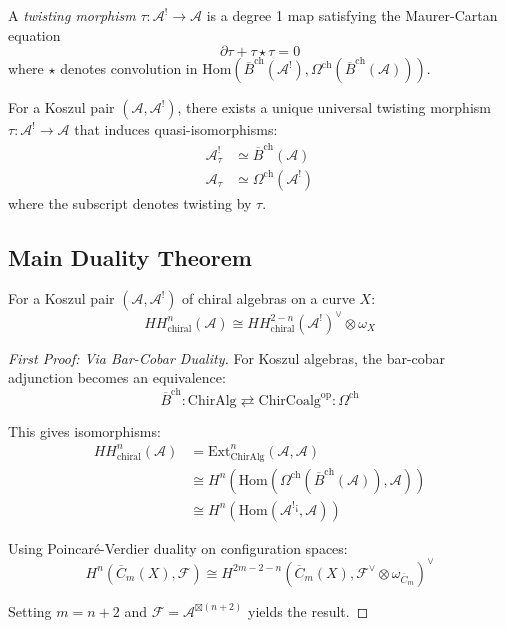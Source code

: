 \begin{definition}
A \emph{twisting morphism} $\tau: \mathcal{A}^! \to \mathcal{A}$ is a degree 1 map satisfying the Maurer-Cartan equation
\[
\partial \tau + \tau \star \tau = 0
\]
where $\star$ denotes convolution in $\text{Hom}(\overline{B}^{\text{ch}}(\mathcal{A}^!), \Omega^{\text{ch}}(\overline{B}^{\text{ch}}(\mathcal{A})))$.
\end{definition}

\begin{theorem}
For a Koszul pair $(\mathcal{A}, \mathcal{A}^!)$, there exists a unique universal twisting morphism $\tau: \mathcal{A}^! \to \mathcal{A}$ that induces quasi-isomorphisms:
\begin{align}
\mathcal{A}^!_{\tau} &\simeq \overline{B}^{\text{ch}}(\mathcal{A}) \\
\mathcal{A}_{\tau} &\simeq \Omega^{\text{ch}}(\mathcal{A}^!)
\end{align}
where the subscript denotes twisting by $\tau$.
\end{theorem}

\subsection{Main Duality Theorem}

\begin{theorem}
\label{thm:main-koszul-hoch}
For a Koszul pair $(\mathcal{A}, \mathcal{A}^!)$ of chiral algebras on a curve $X$:
\[
HH^n_{\text{chiral}}(\mathcal{A}) \cong HH^{2-n}_{\text{chiral}}(\mathcal{A}^!)^{\vee} \otimes \omega_X
\]
\end{theorem}

\begin{proof}[First Proof: Via Bar-Cobar Duality]
For Koszul algebras, the bar-cobar adjunction becomes an equivalence:
\[
\overline{B}^{\text{ch}}: \text{ChirAlg} \rightleftarrows \text{ChirCoalg}^{\text{op}}: \Omega^{\text{ch}}
\]

This gives isomorphisms:
\begin{align}
HH^n_{\text{chiral}}(\mathcal{A}) &= \text{Ext}^n_{\text{ChirAlg}}(\mathcal{A}, \mathcal{A}) \\
&\cong H^n(\text{Hom}(\Omega^{\text{ch}}(\overline{B}^{\text{ch}}(\mathcal{A})), \mathcal{A})) \\
&\cong H^n(\text{Hom}(\mathcal{A}^!{}^{\text{¡}}, \mathcal{A}))
\end{align}

Using Poincaré-Verdier duality on configuration spaces:
\[
H^n(\overline{C}_m(X), \mathcal{F}) \cong H^{2m-2-n}(\overline{C}_m(X), \mathcal{F}^{\vee} \otimes \omega_{\overline{C}_m})^{\vee}
\]

Setting $m = n+2$ and $\mathcal{F} = \mathcal{A}^{\boxtimes (n+2)}$ yields the result.
\end{proof}

